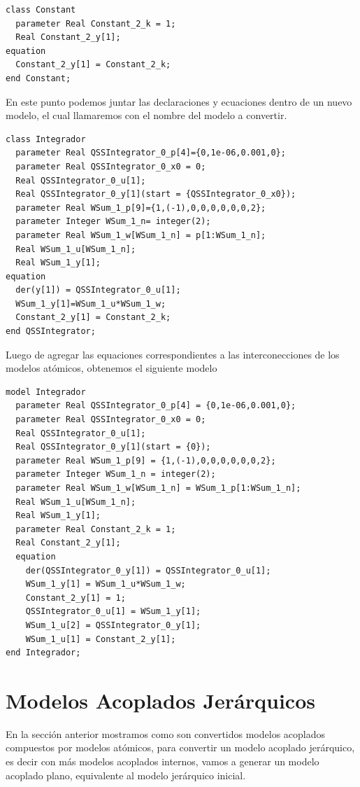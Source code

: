 \begin{verbatim}        
class Constant
  parameter Real Constant_2_k = 1;
  Real Constant_2_y[1];
equation
  Constant_2_y[1] = Constant_2_k;
end Constant;   
\end{verbatim}

En este punto podemos juntar las declaraciones y ecuaciones dentro de un nuevo modelo, el cual llamaremos con el nombre del modelo a convertir.

\begin{verbatim}        
class Integrador
  parameter Real QSSIntegrator_0_p[4]={0,1e-06,0.001,0};
  parameter Real QSSIntegrator_0_x0 = 0;
  Real QSSIntegrator_0_u[1];
  Real QSSIntegrator_0_y[1](start = {QSSIntegrator_0_x0});
  parameter Real WSum_1_p[9]={1,(-1),0,0,0,0,0,0,2};
  parameter Integer WSum_1_n= integer(2);
  parameter Real WSum_1_w[WSum_1_n] = p[1:WSum_1_n];
  Real WSum_1_u[WSum_1_n];
  Real WSum_1_y[1];
equation
  der(y[1]) = QSSIntegrator_0_u[1];
  WSum_1_y[1]=WSum_1_u*WSum_1_w;
  Constant_2_y[1] = Constant_2_k;
end QSSIntegrator;
\end{verbatim}

Luego de agregar las equaciones correspondientes a las interconecciones de los modelos atómicos, obtenemos el siguiente modelo
        
\begin{verbatim}
model Integrador
  parameter Real QSSIntegrator_0_p[4] = {0,1e-06,0.001,0};
  parameter Real QSSIntegrator_0_x0 = 0;
  Real QSSIntegrator_0_u[1];
  Real QSSIntegrator_0_y[1](start = {0});
  parameter Real WSum_1_p[9] = {1,(-1),0,0,0,0,0,0,2};
  parameter Integer WSum_1_n = integer(2);
  parameter Real WSum_1_w[WSum_1_n] = WSum_1_p[1:WSum_1_n];
  Real WSum_1_u[WSum_1_n];
  Real WSum_1_y[1];
  parameter Real Constant_2_k = 1;
  Real Constant_2_y[1];
  equation
    der(QSSIntegrator_0_y[1]) = QSSIntegrator_0_u[1];
    WSum_1_y[1] = WSum_1_u*WSum_1_w;
    Constant_2_y[1] = 1;
    QSSIntegrator_0_u[1] = WSum_1_y[1];
    WSum_1_u[2] = QSSIntegrator_0_y[1];
    WSum_1_u[1] = Constant_2_y[1];
end Integrador;
\end{verbatim}

\section{Modelos Acoplados Jerárquicos}
En la sección anterior mostramos como son convertidos modelos acoplados compuestos por modelos atómicos, para convertir un modelo acoplado jerárquico, es decir con más modelos acoplados internos, vamos a generar un modelo acoplado plano, equivalente al modelo jerárquico inicial.

